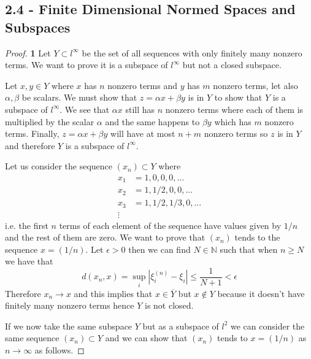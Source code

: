 \documentclass[11pt]{article}
\newcommand{\N}{\mathbb{N}}
\theoremstyle{definition}
\begin{document}
\subsection*{2.4 - Finite Dimensional Normed Spaces and Subspaces}
\begin{proof}{\textbf{1}}
    Let $Y \subset l^\infty$ be the set of all sequences with only finitely
    many nonzero terms. We want to prove it is a subspace of $l^\infty$ but
    not a closed subspace.

    Let $x,y \in Y$ where $x$ has $n$ nonzero terms and $y$ has $m$ nonzero
    terms, let also $\alpha, \beta$ be scalars. We must show that
    $z = \alpha x + \beta y$ is in $Y$ to show that $Y$ is a subspace of
    $l^\infty$. We see that $\alpha x$ still has $n$ nonzero terms where each
    of them is multiplied by the scalar $\alpha$ and the same happens to
    $\beta y$ which has $m$ nonzero terms. Finally, $z = \alpha x + \beta y$
    will have at most $n + m$ nonzero terms so $z$ is in $Y$ and therefore 
    $Y$ is a subspace of $l^\infty$.
    
    Let us consider the sequence $(x_n) \subset Y$ where 
    \begin{align*}
        x_1 &= 1, 0, 0, 0, ...\\
        x_2 &= 1, 1/2, 0, 0, ...\\
        x_3 &= 1, 1/2, 1/3, 0, ...\\
        \vdots
    \end{align*}
    i.e. the first $n$ terms of each element of the sequence have values given
    by $1/n$ and the rest of them are zero.
    We want to prove that $(x_n)$ tends to the sequence $x = (1/n)$.
    Let $\epsilon > 0$ then we can find $N \in \N$ such that when $n \geq N$
    we have that
    $$d(x_n, x) = \sup_i |\xi_i^{(n)} - \xi_i| \leq \frac{1}{N + 1} < \epsilon$$
    Therefore $x_n \to x$ and this implies that $x \in \overline{Y}$ but
    $x \not\in Y$ because it doesn't have finitely many nonzero terms
    hence $Y$ is not closed.

    If we now take the same subspace $Y$ but as a subspace of $l^2$ we can
    consider the same sequence $(x_n) \subset Y$ and we can show that 
    $(x_n)$ tends to $x = (1/n)$ as $n \to \infty$ as follows.


\end{proof}
\end{document}
